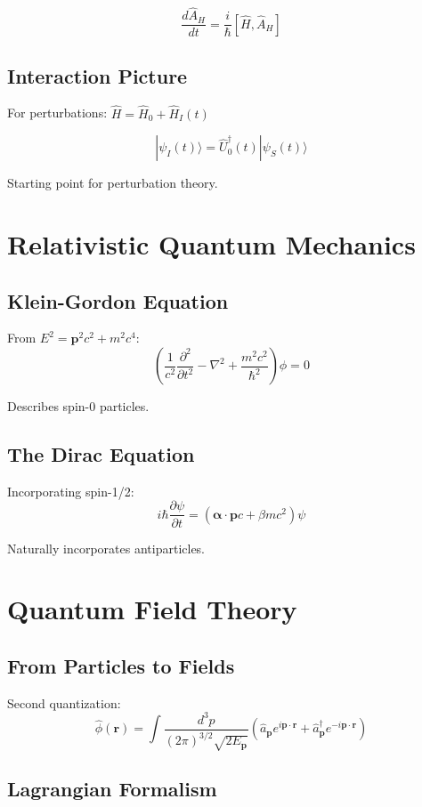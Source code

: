 \documentclass[12pt]{book}
\begin{document}
$$\frac{d\hat{A}_H}{dt} = \frac{i}{\hbar}[\hat{H}, \hat{A}_H]$$

\section{Interaction Picture}

For perturbations: $\hat{H} = \hat{H}_0 + \hat{H}_I(t)$

$$|\psi_I(t)\rangle = \hat{U}_0^\dagger(t)|\psi_S(t)\rangle$$

Starting point for perturbation theory.

\chapter{Relativistic Quantum Mechanics}

\section{Klein-Gordon Equation}

From $E^2 = \mathbf{p}^2c^2 + m^2c^4$:
$$\left(\frac{1}{c^2}\frac{\partial^2}{\partial t^2} - \nabla^2 + \frac{m^2c^2}{\hbar^2}\right)\phi = 0$$

Describes spin-0 particles.

\section{The Dirac Equation}

Incorporating spin-1/2:
$$i\hbar\frac{\partial\psi}{\partial t} = (\boldsymbol{\alpha} \cdot \mathbf{p}c + \beta mc^2)\psi$$

Naturally incorporates antiparticles.

\chapter{Quantum Field Theory}

\section{From Particles to Fields}

Second quantization:
$$\hat{\phi}(\mathbf{r}) = \int \frac{d^3p}{(2\pi)^{3/2}\sqrt{2E_\mathbf{p}}}(\hat{a}_\mathbf{p}e^{i\mathbf{p} \cdot \mathbf{r}} + \hat{a}_\mathbf{p}^\dagger e^{-i\mathbf{p} \cdot \mathbf{r}})$$

\section{Lagrangian Formalism}
\end{document}
